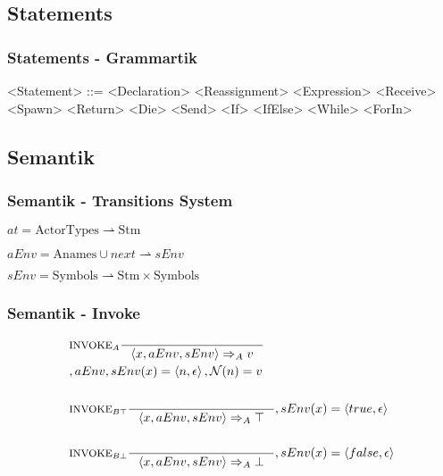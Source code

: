 \subsection{Statements}
\begin{frame}
  \frametitle{Statements - Grammartik}
	\begin{grammar}
  <Statement> ::= <Declaration>
    \alt <Reassignment>
    \alt <Expression>
    \alt <Receive>
    \alt <Spawn>
    \alt <Return>
    \alt <Die>
    \alt <Send>
    \alt <If>
    \alt <IfElse>
    \alt <While>
    \alt <ForIn>
  \end{grammar}
\end{frame}

\subsection{Semantik}
\begin{frame}
	\frametitle{Semantik - Transitions System}
	\begin{center}	
  $at = \text{ActorTypes} \rightharpoonup \text{Stm}$
	
	$aEnv = \text{Anames} \cup {next} \rightharpoonup sEnv$
	
	$sEnv = \text{Symbols} \rightharpoonup \text{Stm} \times \text{Symbols}$
  \end{center}
\end{frame}

\begin{frame}
	\frametitle{Semantik - Invoke}
	\begin{align*}
	&\inference[$\text{INVOKE}_{A}$]{}
                  {\Braket{x,aEnv,sEnv} \Rightarrow_A v}
                  \\
									&{,aEnv,sEnv(x) = \Braket{n,\epsilon}, \mathcal{N}(n) = v}
	\\\\
	&\inference[$\text{INVOKE}_{B\top}$]{}
                  {\Braket{x,aEnv,sEnv} \Rightarrow_A \top}
                  {,sEnv(x) = \Braket{true,\epsilon}}
	\\\\
	&\inference[$\text{INVOKE}_{B\bot}$]{}
                  {\Braket{x,aEnv,sEnv} \Rightarrow_A \bot}
                  {,sEnv(x) = \Braket{false,\epsilon}}
	\end{align*}
\end{frame}

